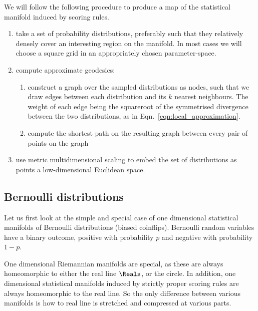 We will follow the following procedure to produce a map of the statistical manifold induced by scoring rules.

\begin{enumerate}
\item take a set of probability distributions, preferably such that they relatively densely cover an interesting region on the manifold. In most cases we will choose a square grid in an appropriately chosen parameter-space.
\item compute approximate geodesics:
\begin{enumerate}
	\item construct a graph over the sampled distributions as nodes, such that we draw edges between each distribution and its $k$ nearest neighbours. The weight of each edge being the squareroot of the symmetrised divergence between the two distributions, as in Eqn.\ \eqref{eqn:local_approximation}.
	\item compute the shortest path on the resulting graph between every pair of points on the graph
\end{enumerate}
\item use metric multidimensional scaling to embed the set of distributions as points a low-dimensional Euclidean space.
\end{enumerate}

\subsection{Bernoulli distributions}

Let us first look at the simple and special case of one dimensional statistical manifolds of Bernoulli distributions (biased coinflips). Bernoulli random variables have a binary outcome, positive with probability $p$ and negative with probability $1-p$.

One dimensional Riemannian manifolds are special, as these are always homeomorphic to either the real line $\Reals$, or the circle. In addition, one dimensional statistical manifolds induced by strictly proper scoring rules are always homeomorphic to the real line. So the only difference between various manifolds is how to real line is stretched and compressed at various parts.

